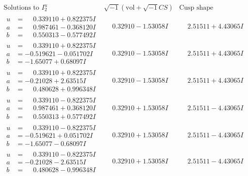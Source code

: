 \documentclass[1p]{elsarticle_modified}
\theoremstyle{definition}
\newcommand{\I}{\sqrt{-1}}
\begin{document}
$$\begin{array}{c|c|c}  
\text{Solutions to }I^u_{2}& \I (\text{vol} + \sqrt{-1}CS) & \text{Cusp shape}\\
 \hline 
\begin{aligned}
u &= \phantom{-}0.339110 + 0.822375 I \\
a &= \phantom{-}0.987461 - 0.368120 I \\
b &= \phantom{-}0.550313 - 0.577492 I\end{aligned}
 & \phantom{-}0.32910 - 1.53058 I & \phantom{-}2.51511 + 4.43065 I \\ \hline\begin{aligned}
u &= \phantom{-}0.339110 + 0.822375 I \\
a &= -0.519621 - 0.051702 I \\
b &= -1.65077 + 0.68097 I\end{aligned}
 & \phantom{-}0.32910 - 1.53058 I & \phantom{-}2.51511 + 4.43065 I \\ \hline\begin{aligned}
u &= \phantom{-}0.339110 + 0.822375 I \\
a &= -0.21028 + 2.63515 I \\
b &= \phantom{-}0.480628 + 0.996348 I\end{aligned}
 & \phantom{-}0.32910 - 1.53058 I & \phantom{-}2.51511 + 4.43065 I \\ \hline\begin{aligned}
u &= \phantom{-}0.339110 - 0.822375 I \\
a &= \phantom{-}0.987461 + 0.368120 I \\
b &= \phantom{-}0.550313 + 0.577492 I\end{aligned}
 & \phantom{-}0.32910 + 1.53058 I & \phantom{-}2.51511 - 4.43065 I \\ \hline\begin{aligned}
u &= \phantom{-}0.339110 - 0.822375 I \\
a &= -0.519621 + 0.051702 I \\
b &= -1.65077 - 0.68097 I\end{aligned}
 & \phantom{-}0.32910 + 1.53058 I & \phantom{-}2.51511 - 4.43065 I \\ \hline\begin{aligned}
u &= \phantom{-}0.339110 - 0.822375 I \\
a &= -0.21028 - 2.63515 I \\
b &= \phantom{-}0.480628 - 0.996348 I\end{aligned}
 & \phantom{-}0.32910 + 1.53058 I & \phantom{-}2.51511 - 4.43065 I \\ \hline\begin{aligned}

\end{aligned}
\end{array}$$
\end{document}
